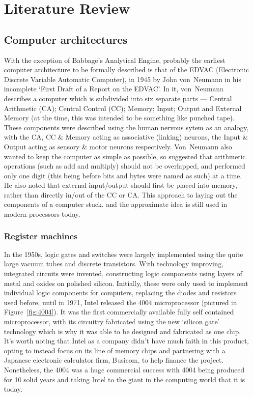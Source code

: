 \chapter{Literature Review}\label{ch:litreview}
\section{Computer architectures}
With the exception of Babbage's Analytical Engine, probably the earliest
computer architecture to be formally described is that of the EDVAC (Electronic
Discrete Variable Automatic Computer), in 1945 by John von~Neumann in his
incomplete `First Draft of a Report on the EDVAC'. In it, von~Neumann describes
a computer which is subdivided into six separate parts --- Central Arithmetic
(CA); Central Control (CC); Memory; Input; Output and External Memory (at the
time, this was intended to be something like punched tape). These components
were described using the human nervous sytem as an analogy, with the CA, CC \&
Memory acting as associative (linking) neurons, the Input \& Output acting as
sensory \& motor neurons respectively.
Von~Neumann also wanted to keep the computer as simple as possible, so suggested
that arithmetic operations (such as add and multiply) should not be overlapped,
and performed only one digit (this being before bits and bytes were named as
such) at a time. He also noted that external input/output should first be placed
into memory, rather than directly in/out of the CC or CA\@. This approach to
laying out the components of a computer stuck, and the approximate idea is still
used in modern processors today.\cite{FirstDraft}

\subsection{Register machines}
In the 1950s, logic gates and switches were largely implemented using the quite
large vacuum tubes and discrete transistors. With technology improving,
integrated circuits were invented, constructing logic components using layers of
metal and oxides on polished silicon. Initially, these were only used to
implement individual logic components for computers, replacing the diodes and
resistors used before, until in 1971, Intel released the 4004 microprocessor
(pictured in Figure~\ref{fig:4004}).
It was the first commercially available fully self contained microprocessor,
with its circuitry fabricated using the new `silicon gate' technology which is
why it was able to be designed and fabricated as one chip. It's worth noting
that Intel as a company didn't have much faith in this product, opting to
instead focus on its line of memory chips and partnering with a Japanese
electronic calculator firm, Busicom, to help finance the project. Nonetheless,
the 4004 was a huge commercial success with 4004 being produced for 10 solid
years and taking Intel to the giant in the computing world that it is
today.\cite{Aspray1997Intel}

